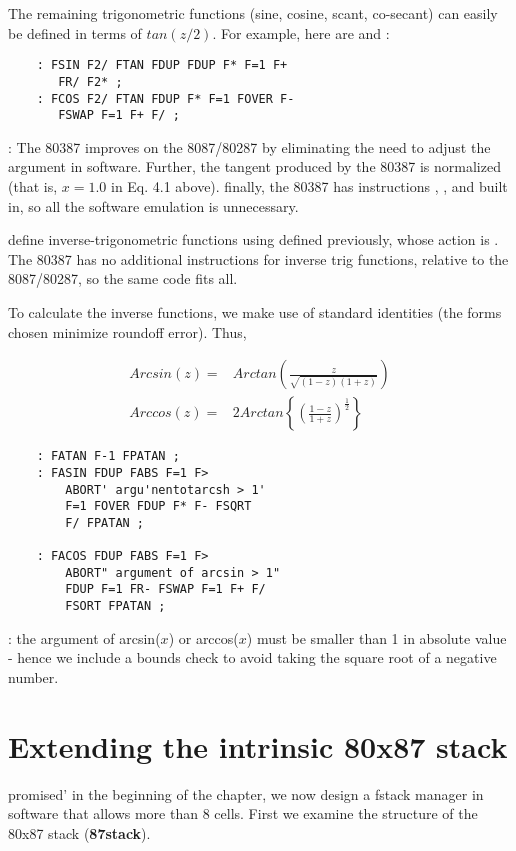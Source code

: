 The remaining trigonometric functions (sine, cosine, scant, co-secant) can easily be defined in terms of $tan(z /2)$. For example, here are  and :

\begin{lstlisting}
    : FSIN F2/ FTAN FDUP FDUP F* F=1 F+
       FR/ F2* ;
    : FCOS F2/ FTAN FDUP F* F=1 FOVER F-
       FSWAP F=1 F+ F/ ;
\end{lstlisting}

\leftbar[1\linewidth]
\Note: The 80387 improves on the 8087/80287 by eliminating the
need to adjust the argument in software. Further, the tangent
produced by the 80387 is normalized (that is, $x = 1.0$ in Eq. 4.1
above). finally, the 80387 has instructions , , and  built in, so all the software emulation is unnecessary.
\endleftbar

 define inverse-trigonometric functions using  defined previously, whose action is . The 80387 has no additional instructions for inverse trig functions, relative to the 8087/80287, so the same code fits all.

To calculate the inverse functions, we make use of standard identities (the forms chosen minimize roundoff error). Thus,

\begin{align}
    Arcsin(z) =& Arctan\left(\frac{z}{\sqrt{(1-z)(1+z)}}\right) \\
    Arccos(z) =& 2 Arctan\left \{\left (\frac{1-z}{1+z}\right)^{\frac{1}{2}}\right \}
\end{align}

\begin{lstlisting}
    : FATAN F-1 FPATAN ;
    : FASIN FDUP FABS F=1 F>
        ABORT' argu'nentotarcsh > 1'
        F=1 FOVER FDUP F* F- FSQRT
        F/ FPATAN ;

    : FACOS FDUP FABS F=1 F>
        ABORT" argument of arcsin > 1"
        FDUP F=1 FR- FSWAP F=1 F+ F/
        FSORT FPATAN ;
\end{lstlisting}

\leftbar[1\linewidth]
\Note: the argument of arcsin($x$) or arccos($x$) must be smaller than
1 in absolute value - hence we include a bounds check to avoid taking the square root of a negative number.
\endleftbar

\section{Extending the intrinsic 80x87 stack}
 promised' in the beginning of the chapter, we now design
a fstack manager in software that allows more than 8 cells. First we examine the structure of the 80x87 stack (\textbf{87stack}).

